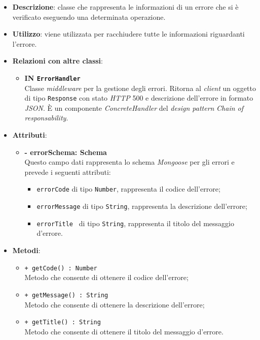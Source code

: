 \begin{itemize}
	\item \textbf{Descrizione}: classe che rappresenta le informazioni di un errore che si è verificato eseguendo una determinata operazione.
	\item \textbf{Utilizzo}:	viene utilizzata per racchiudere tutte le informazioni riguardanti l'errore.
	\item \textbf{Relazioni con altre classi}:
		\begin{itemize}
			\item \textbf{IN \texttt{ErrorHandler}} \\
			Classe \textit{middleware} per la gestione degli errori. Ritorna al \textit{client} un oggetto di tipo \texttt{Response} con stato \textit{HTTP} 500 e descrizione dell'errore in formato \textit{JSON}. È un componente \textit{ConcreteHandler} del \textit{design pattern} \textit{Chain of responsability}.
		\end{itemize}
	\item \textbf{Attributi}:
		\begin{itemize}
			\item \textbf{- errorSchema: Schema} \\
			Questo campo dati rappresenta lo schema \textit{Mongoose} per gli errori e prevede i seguenti attributi:
				\begin{itemize}
					\item \texttt{errorCode} di tipo \texttt{Number}, rappresenta il codice dell'errore;
					\item \texttt{errorMessage} di tipo \texttt{String}, rappresenta la descrizione dell'errore; 
					\item \texttt{errorTitle	} di tipo \texttt{String}, rappresenta il titolo del messaggio d'errore.
				\end{itemize}
		\end{itemize}
	\item \textbf{Metodi}:
		\begin{itemize}
			\item \texttt{+ getCode() : Number} \\
			Metodo che consente di ottenere il codice dell'errore;
			\item \texttt{+ getMessage() : String} \\
			Metodo che consente di ottenere la descrizione dell'errore;
			\item \texttt{+ getTitle() : String} \\
			Metodo che consente di ottenere il titolo del messaggio d'errore. 
		\end{itemize}
\end{itemize}